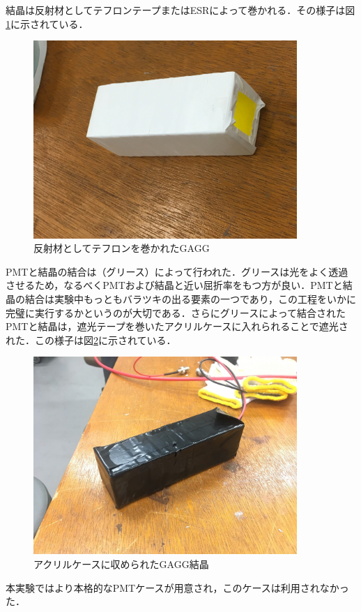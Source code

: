 \documentclass[a4j]{jarticle}
\begin{document}
結晶は反射材としてテフロンテープまたはESRによって巻かれる．その様子は図\ref{023945_3Sep18}に示されている．
\begin{figure}[htb]
 \centering
 \includegraphics[bb=0 0 4032 3024,width=10cm]{tefron.jpg}
 \caption{反射材としてテフロンを巻かれたGAGG}
 \label{023945_3Sep18}
\end{figure}

PMTと結晶の結合は（グリース）によって行われた．グリースは光をよく透過させるため，なるべくPMTおよび結晶と近い屈折率をもつ方が良い．PMTと結晶の結合は実験中もっともバラツキの出る要素の一つであり，この工程をいかに完璧に実行するかというのが大切である．さらにグリースによって結合されたPMTと結晶は，遮光テープを巻いたアクリルケースに入れられることで遮光された．この様子は図\ref{033232_3Sep18}に示されている．
\begin{figure}[htb]
 \centering
 \includegraphics[bb=0 0 1478 1108,width=10cm]{akuriru.jpg}
 \caption{アクリルケースに収められたGAGG結晶}
 \label{033232_3Sep18}
\end{figure}
本実験ではより本格的なPMTケースが用意され，このケースは利用されなかった．
\end{document}
